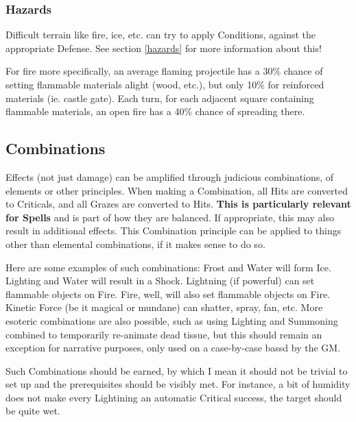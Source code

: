 \subsubsection{Hazards}

Difficult terrain like fire, ice, etc. can try to apply Conditions, against the appropriate Defense. See section \ref{hazards} for more information about this!

For fire more specifically, an average flaming projectile has a 30\% chance of setting flammable materials alight (wood, etc.), but only 10\% for reinforced materials (ie. castle gate). Each turn, for each adjacent square containing flammable materials, an open fire has a 40\% chance of spreading there.



\subsection{Combinations}

\label{combinations}

Effects (not just damage) can be amplified through judicious combinations, of elements or other principles. When making a Combination, all Hits are converted to Criticals, and all Grazes are converted to Hits. \textbf{This is particularly relevant for Spells} and is part of how they are balanced. If appropriate, this may also result in additional effects. This Combination principle can be applied to things other than elemental combinations, if it makes sense to do so.

Here are some examples of such combinations: Frost and Water will form Ice. Lighting and Water will result in a Shock. Lightning (if powerful) can set flammable objects on Fire. Fire, well, will also set flammable objects on Fire. Kinetic Force (be it magical or mundane) can shatter, spray, fan, etc. More esoteric combinations are also possible, such as using Lighting and Summoning combined to temporarily re-animate dead tissue, but this should remain an exception for narrative purposes, only used on a case-by-case bassd by the GM.

Such Combinations should be earned, by which I mean it should not be trivial to set up and the prerequisites should be visibly met. For instance, a bit of humidity does not make every Lightining an automatic Critical success, the target should be quite wet.

